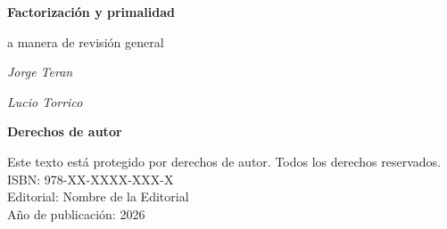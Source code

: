 \begin{titlepage}
    \centering
    \vspace*{2cm}
    {\Huge\bfseries Factorización y primalidad\par}
    \vspace{1cm}
    {\Large a manera de revisión general\par}
    \vspace{3cm}
    {\large\itshape Jorge Teran\par}
    {\large\itshape Lucio Torrico\par}
    \vfill
\end{titlepage}

\cleardoublepage
\thispagestyle{empty}
\vspace*{5cm}
\begin{center}
    \Large\textbf{Derechos de autor}
\end{center}
\vspace{2cm}
\noindent
Este texto está protegido por derechos de autor. Todos los derechos reservados.\\
\vspace{1cm}
\noindent
ISBN: 978-XX-XXXX-XXX-X\\
\vspace{0.5cm}
\noindent
Editorial: Nombre de la Editorial\\
\vspace{0.5cm}
\noindent
Año de publicación: 2026

\cleardoublepage
\tableofcontents

\listoffigures

\listoftables

